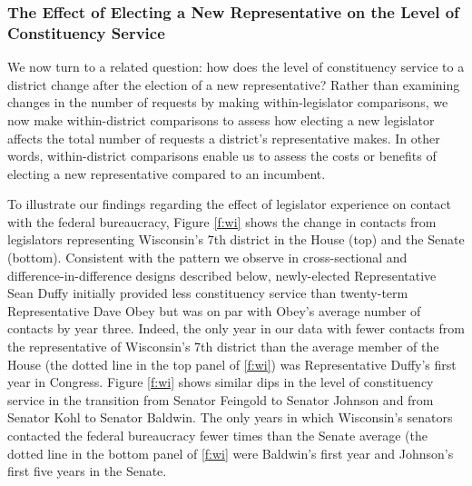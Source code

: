 \documentclass[12pt]{article}
\begin{document}
\subsubsection{The Effect of Electing a New Representative on the Level of Constituency Service}\label{s:tenure_dist}

We now turn to a related question: how does the level of constituency service to a district change after the election of a new representative? Rather than examining changes in the number of requests by making within-legislator comparisons, we now make within-district comparisons to assess how electing a new legislator affects the total number of requests a district's representative makes. In other words, within-district comparisons enable us to assess the costs or benefits of electing a new representative compared to an incumbent.%


To illustrate our findings regarding the effect of legislator experience on contact with the federal bureaucracy, Figure \ref{f:wi} shows the change in contacts from legislators representing Wisconsin's 7th district in the House (top) and the Senate (bottom). 
Consistent with the pattern we observe in cross-sectional and difference-in-difference designs described below, newly-elected Representative Sean Duffy initially provided less constituency service than twenty-term Representative Dave Obey but was on par with Obey's average number of contacts by year three. Indeed, the only year in our data with fewer contacts from the representative of Wisconsin's 7th district than the average member of the House (the dotted line in the top panel of \ref{f:wi}) was Representative Duffy's first year in Congress. Figure \ref{f:wi} shows similar dips in the level of constituency service in the transition from Senator Feingold to Senator Johnson and from Senator Kohl to Senator Baldwin. The only years in which Wisconsin's senators contacted the federal bureaucracy fewer times than the Senate average (the dotted line in the bottom panel of \ref{f:wi} were Baldwin's first year and Johnson's first five years in the Senate. 
\end{document}
